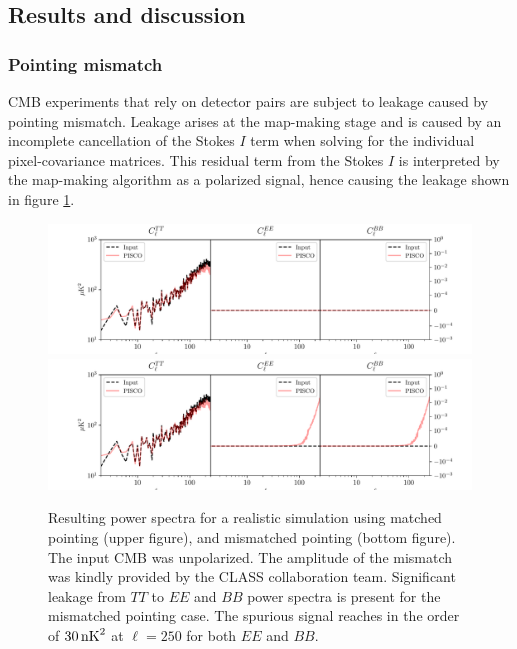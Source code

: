 \documentclass[a4paper,11pt]{article}
\begin{document}
\subsection{Results and discussion}

\subsubsection{Pointing mismatch}

CMB experiments that rely on detector pairs are subject to leakage caused by pointing mismatch. Leakage arises at the map-making stage and is caused by an incomplete cancellation of the Stokes $I$ term when solving for the individual pixel-covariance matrices. This residual term from the Stokes $I$ is interpreted by the map-making algorithm as a polarized signal, hence causing the leakage shown in figure \ref{fig::pisco4class_pointingmismatch}. %

\begin{figure}
	\centering
	\includegraphics[width=1\textwidth]{figures/unpolCMB_r0d00_CLASS_matchedPointing_matchedBeams_ellipticalBeams.pdf}
	\includegraphics[width=1\textwidth]{figures/unpolCMB_r0d00_CLASS_mismatchedPointing_matchedBeams_ellipticalBeams.pdf}
	\caption{Resulting power spectra for a realistic simulation using matched pointing (upper figure), and mismatched pointing (bottom figure). The input CMB was unpolarized. The amplitude of the mismatch was kindly provided by the CLASS collaboration team. Significant leakage from $TT$ to $EE$ and $BB$ power spectra is present for the mismatched pointing case. The spurious signal reaches in the order of $30\, \rm{nK}^2$ at $\ell = 250$ for both $EE$ and $BB$.}
	\label{fig::pisco4class_pointingmismatch}
\end{figure}
\end{document}
